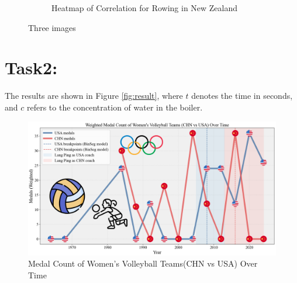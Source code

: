 \documentclass[12pt]{article}  %
\begin{document}
\begin{figure}[htbp]
\begin{subfigure}[b]{.32\textwidth}
		\caption{Heatmap of Correlation for Rowing in New Zealand}\label{subfig:3}
	\end{subfigure}
	\caption{Three images}\label{fig:subfigures}
\end{figure}



\section{Task2:}

The results are shown in Figure \ref{fig:result}, where $t$ denotes the time in seconds, and $c$ refers to the concentration of water in the boiler.


\begin{figure}[htbp]
	\centering
	\includegraphics[width=16cm]{img/Volleyball.png}
	\caption{Medal Count of Women's Volleyball Teams(CHN vs USA) Over Time}
	\label{fig:aa}
\end{figure}
\end{document}
